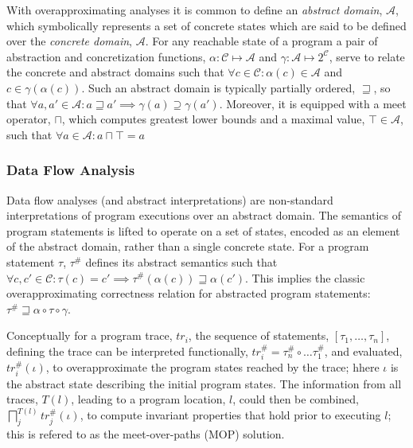 With overapproximating analyses it is common to define an \textit{abstract
domain}, $\mathcal{A}$, 
which symbolically represents a set of concrete states which 
are said to be defined over the \textit{concrete domain}, $\mathcal{A}$.
For any reachable state of a program a pair of abstraction 
and concretization functions, 
$\alpha : \mathcal{C} \mapsto \mathcal{A}$ and  
$\gamma : \mathcal{A} \mapsto 2^\mathcal{C}$,
serve to relate the concrete and abstract domains such that 
$\forall c \in \mathcal{C} : \alpha(c) \in \mathcal{A}$ and $c \in \gamma(\alpha(c))$.
Such an abstract domain is typically partially ordered, $\sqsupseteq$,
so that 
$\forall a,a' \in \mathcal{A} :  a \sqsupseteq a' \implies \gamma(a) \supseteq \gamma(a')$.
Moreover, it is equipped with a meet operator, $\sqcap$, which
computes greatest lower bounds and a maximal
value, $\top \in \mathcal{A}$, such that 
$\forall a \in \mathcal{A} : a \sqcap \top = a$

\subsubsection{Data Flow Analysis}
Data flow analyses (and abstract interpretations) are 
non-standard interpretations of program executions over an abstract domain.  
The semantics of program statements is lifted to operate
on a set of states, encoded as an element of the abstract domain,
rather than a single concrete state.  
For a program statement $\tau$,
$\tau^\#$ defines its abstract semantics such that
$\forall c, c' \in \mathcal{C} : \tau(c) = c' \implies \tau^\#(\alpha(c)) \sqsupseteq \alpha(c')$.  This implies the classic overapproximating correctness
relation for abstracted program statements:
$\tau^\# \sqsupseteq \alpha \circ \tau \circ \gamma$.

Conceptually for a program trace, $tr_i$, the sequence of 
statements, $[\tau_1,\ldots,\tau_n]$, defining the trace can
be interpreted functionally, $tr_i^\# = \tau_{n}^\# \circ \ldots \tau_1^\#$,
and evaluated, $tr_i^\#(\iota)$,
to overapproximate the program states reached by the trace; 
hhere $\iota$ is the abstract state describing the initial program states.
The information from all traces, $T(l)$, leading to a program location, $l$, 
could then be combined, $\displaystyle\bigsqcap_j^{T(l)} tr_j^\#(\iota)$, to 
compute invariant properties that hold prior to executing $l$; this
is refered to as the meet-over-paths (MOP) solution.

